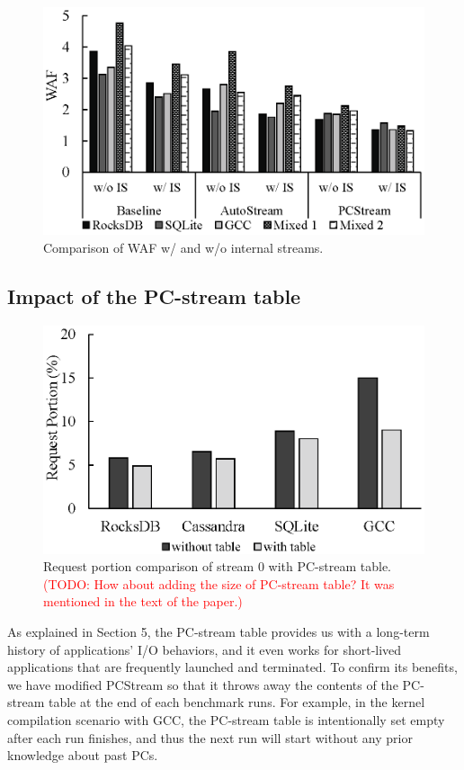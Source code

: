 \begin{figure}[t]
	\centering
	\includegraphics[width=0.9\linewidth]{figure/internal}
	\caption{Comparison of WAF w/ and w/o internal streams.}
	\label{fig:internal}
\end{figure}


\subsection{Impact of the PC-stream table}

\begin{figure}[t]
	\centering
	\includegraphics[width=0.7\linewidth]{figure/pctable}
	\caption{Request portion comparison of stream 0 with PC-stream table.
		\textcolor{red}{
			(TODO: How about adding the size of PC-stream table? It was mentioned in
			the text of the paper.)}
		}
	\label{fig:pctable}
\end{figure}

As explained in Section 5, the PC-stream table provides us with a long-term
history of applications' I/O behaviors, and it even works for short-lived
applications that are frequently launched and terminated. To confirm its
benefits, we have modified \textsf{PCStream} so that it throws away the
contents of the PC-stream table at the end of each benchmark runs. For example,
in the kernel compilation scenario with GCC, the PC-stream table is
intentionally set empty after each run finishes, and thus the next run will
start without any prior knowledge about past PCs.

